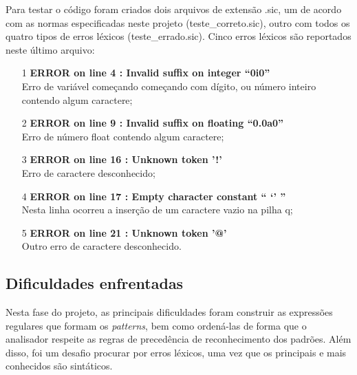 \documentclass[12pt]{article}
\begin{document}
\indent Para testar o código foram criados dois arquivos de extensão .sic, um de acordo com as normas especificadas neste projeto (teste\_correto.sic), outro com todos os quatro tipos de erros léxicos (teste\_errado.sic). Cinco erros léxicos são reportados neste último arquivo:

\begin{itemize}
  \item[1] \textbf{ERROR on line 4 : Invalid suffix on integer ``0i0''} \\ Erro de variável começando começando com dígito, ou número inteiro contendo algum caractere;
  \item[2] \textbf{ERROR on line 9 : Invalid suffix on floating ``0.0a0''} \\ Erro de número float contendo algum caractere;
  \item[3] \textbf{ERROR on line 16 : Unknown token '!'} \\  Erro de caractere desconhecido;
  \item[4] \textbf{ERROR on line 17 : Empty character constant `` `' ''} \\ Nesta linha ocorreu a inserção de um caractere vazio na pilha q;
  \item[5] \textbf{ERROR on line 21 : Unknown token '@'} \\ Outro erro de caractere desconhecido.
\end{itemize}

\subsection{Dificuldades enfrentadas}

\indent Nesta fase do projeto, as principais dificuldades foram construir as expressões regulares que formam os \textit{patterns}, bem como ordená-las de forma que o analisador respeite as regras de precedência de reconhecimento dos padrões. Além disso, foi um desafio procurar por erros léxicos, uma vez que os principais e mais conhecidos são sintáticos.



\end{document}
